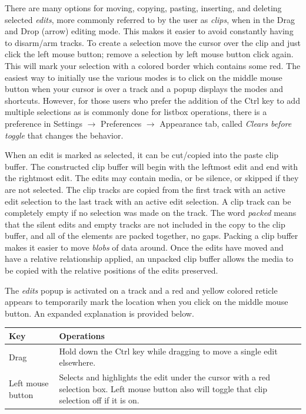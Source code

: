 There are many options for moving, copying, pasting, inserting, and deleting selected \textit{edits}, more commonly referred to by the user as \textit{clips}, when in the Drag and Drop (arrow) editing mode.  This makes it easier to avoid constantly having to disarm/arm tracks.  To create a selection move the cursor over the clip and just click the left mouse button; remove a selection by left mouse button click again.  This will mark your selection with a colored border which contains some red.  The easiest way to initially use the various modes is to click on the middle mouse button when your cursor is over a track and a popup displays the modes and shortcuts.  However, for those users who prefer the addition of the Ctrl key to add multiple selections as is commonly done for listbox operations, there is a preference in Settings $\rightarrow$ Preferences $\rightarrow$ Appearance tab, called \textit{Clears before toggle} that changes the behavior.

When an edit is marked as selected, it can be cut/copied into the paste clip buffer.  The constructed clip buffer will begin with the leftmost edit and end with the rightmost edit.  The edits may contain media, or be silence, or skipped if they are not selected.  The clip tracks are copied from the first track with an active edit selection to the last track with an active edit selection.  A clip track can be completely empty if no selection was made on the track.  The word \textit{packed} means that the silent edits and empty tracks are not included in the copy to the clip buffer, and all of the elements are packed together, no gaps.  Packing a clip buffer makes it easier to move \textit{blobs} of data around.  Once the edits have moved and have a relative relationship applied, an unpacked clip buffer allows the media to be copied with the relative positions of the edits preserved.

The \textit{edits} popup is activated on a track and a red and yellow colored reticle appears to temporarily mark the location when you click on the middle mouse button.  An expanded explanation is provided below.

\begin{center}
    \begin{tabular}{l p{12.9cm}}
        \toprule
        \textbf{Key} & \textbf{Operations} \\
        \midrule
        Drag & Hold down the Ctrl key while dragging to move a single edit elsewhere. \\
        Left mouse button & Selects and highlights the edit under the cursor with a red selection box. Left mouse button also will toggle that clip selection off if it is on. \\
        \bottomrule
    \end{tabular}
\end{center}

